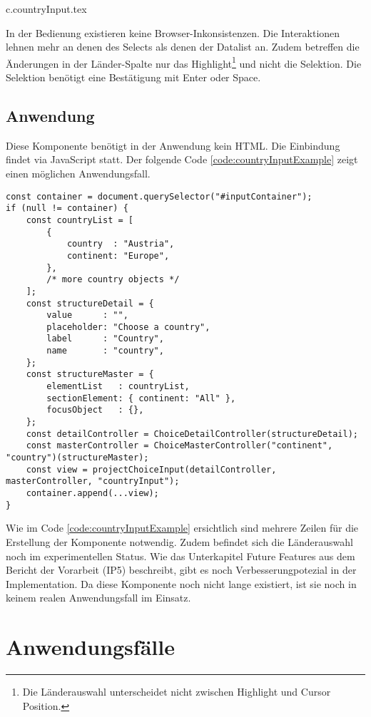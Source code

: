 {c.countryInput.tex}

In der Bedienung existieren keine Browser-Inkonsistenzen.
Die Interaktionen lehnen mehr an denen des Selects als denen der Datalist an.
Zudem betreffen die Änderungen in der Länder-Spalte nur das Highlight\footnote{
    Die Länderauswahl unterscheidet nicht zwischen Highlight und Cursor Position.
} und nicht die Selektion.
Die Selektion benötigt eine Bestätigung mit Enter oder Space.

\subsection{Anwendung}
\label{sec:countryChoiceUse}

Diese Komponente benötigt in der Anwendung kein HTML.
Die Einbindung findet via JavaScript statt.
Der folgende Code \ref{code:countryInputExample} zeigt einen möglichen Anwendungsfall.

\begin{lstlisting}[style = htmlcssjs, caption = Länderauswahl Beispiel, label = code:countryInputExample]
const container = document.querySelector("#inputContainer");
if (null != container) {
    const countryList = [
        {
            country  : "Austria",
            continent: "Europe",
        },
        /* more country objects */
    ];
    const structureDetail = {
        value      : "",
        placeholder: "Choose a country",
        label      : "Country",
        name       : "country",
    };
    const structureMaster = {
        elementList   : countryList,
        sectionElement: { continent: "All" },
        focusObject   : {},
    };
    const detailController = ChoiceDetailController(structureDetail);
    const masterController = ChoiceMasterController("continent", "country")(structureMaster);
    const view = projectChoiceInput(detailController, masterController, "countryInput");
    container.append(...view);
}
\end{lstlisting}

Wie im Code \ref{code:countryInputExample} ersichtlich sind mehrere Zeilen für die Erstellung der Komponente notwendig.
Zudem befindet sich die Länderauswahl noch im experimentellen Status.
Wie das Unterkapitel Future Features aus dem Bericht\citemarktext{
    [\cite{ip5}]
} der Vorarbeit (IP5) beschreibt, gibt es noch Verbesserungpotezial in der Implementation.
Da diese Komponente noch nicht lange existiert, ist sie noch in keinem realen Anwendungsfall im Einsatz.


\section{Anwendungsfälle}
\label{sec:useCases}

